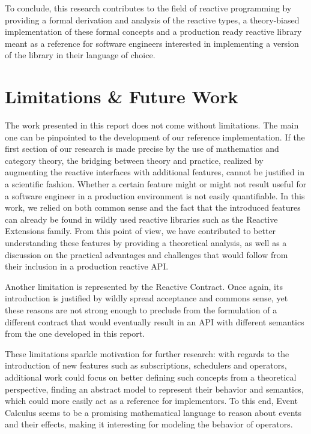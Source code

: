 To conclude, this research contributes to the field of reactive programming by providing a formal derivation and analysis of the reactive types, a theory-biased implementation of these formal concepts and a production ready reactive library meant as a reference for software engineers interested in implementing a version of the library in their language of choice.

\section*{Limitations \& Future Work}
\label{future-work}

The work presented in this report does not come without limitations. The main one can be pinpointed to the development of our reference implementation. If the first section of our research is made precise by the use of mathematics and category theory, the bridging between theory and practice, realized by augmenting the reactive interfaces with additional features, cannot be justified in a scientific fashion. Whether a certain feature might or might not result useful for a software engineer in a production environment is not easily quantifiable. In this work, we relied on both common sense and the fact that the introduced features can already be found in wildly used reactive libraries such as the Reactive Extensions family. From this point of view, we have contributed to better understanding these features by providing a theoretical analysis, as well as a discussion on the practical advantages and challenges that would follow from their inclusion in a production reactive API. 

Another limitation is represented by the Reactive Contract. Once again, its introduction is justified by wildly spread acceptance and commons sense, yet these reasons are not strong enough to preclude from the formulation of a different contract that would eventually result in an API with different semantics from the one developed in this report. 

These limitations sparkle motivation for further research: with regards to the introduction of new features such as subscriptions, schedulers and operators, additional work could focus on better defining such concepts from a theoretical perspective, finding an abstract model to represent their behavior and semantics, which could more easily act as a reference for implementors. To this end, Event Calculus\cite{shanahan1999event} seems to be a promising mathematical language to reason about events and their effects, making it interesting for modeling the behavior of operators.

